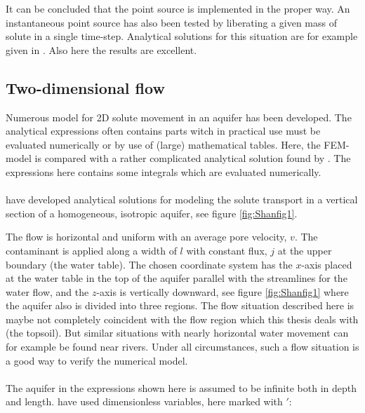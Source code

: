 It can be concluded that the point source is implemented in the proper
way. An instantaneous point source has also been tested by liberating a
given mass of solute in a single time-step. Analytical solutions for
this situation are for example given in \cite{Spitz}. Also here the
results are excellent.


\subsection{Two-dimensional flow}

Numerous model for 2D solute movement in an aquifer has
been developed. The analytical expressions often contains parts witch in practical use must be
evaluated numerically or by use of (large) mathematical tables. Here,
the FEM-model is  compared with a rather complicated analytical
solution found by \cite{Shan}. The expressions here contains some
integrals which are evaluated numerically. \\
\\
\cite{Shan} have developed analytical solutions for modeling the solute
transport in a vertical section of a homogeneous, isotropic aquifer,
see figure \ref{fig:Shanfig1}.




The flow is horizontal and uniform with an average pore velocity,
$v$. The contaminant is applied along a width of $l$ with constant
flux, $j$ at the upper boundary (the water table). The chosen
coordinate system has the $x$-axis placed at the water table in the
top of the aquifer parallel with the streamlines for the water flow,
and the $z$-axis is vertically downward, see figure \ref{fig:Shanfig1}
where the aquifer also is divided into three regions. The flow
situation described here is maybe not completely coincident with the
flow region which this thesis deals with (the topsoil). But similar
situations with nearly horizontal water movement can for example be
found near rivers. Under all circumstances, such a flow situation is a
good way to verify the numerical model. \\
\\
The aquifer in the expressions shown here is assumed to be infinite
both in depth and length. %
\cite{Shan} have used dimensionless variables, here marked with $'$:


